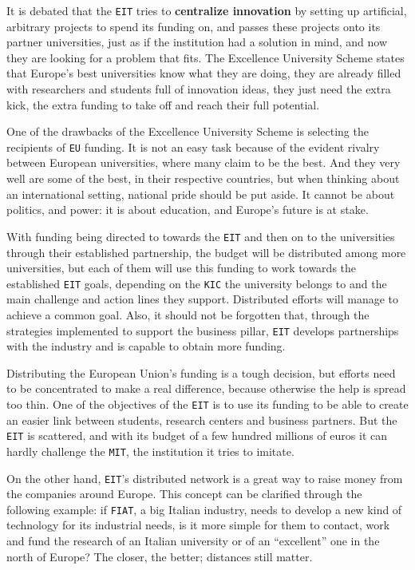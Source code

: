 \documentclass[11pt,a4paper,oneside,twocolumn]{IEEEtran}
\begin{document}
It is debated that the \texttt{EIT} tries to \textbf{centralize innovation} by setting up artificial, arbitrary projects to spend its funding on, and passes these projects onto its partner universities, just as if the institution had a solution in mind, and now they are looking for a problem that fits. The Excellence University Scheme states that Europe's best universities know what they are doing, they are already filled with researchers and students full of innovation ideas, they just need the extra kick, the extra funding to take off and reach their full potential.

One of the drawbacks of the Excellence University Scheme is selecting the recipients of \texttt{EU} funding. It is not an easy task because of the evident rivalry between European universities, where many claim to be the best. And they very well are some of the best, in their respective countries, but when thinking about an international setting, national pride should be put aside. It cannot be about politics, and power: it is about education, and Europe's future is at stake\cite{6_4}.

With funding being directed to towards the \texttt{EIT} and then on to the universities through their established partnership, the budget will be distributed among more universities, but each of them will use this funding to work towards the established \texttt{EIT} goals, depending on the \texttt{KIC} the university belongs to and the main challenge and action lines they support. Distributed efforts will manage to achieve a common goal. Also, it should not be forgotten that, through the strategies implemented to support the business pillar, \texttt{EIT} develops partnerships with the industry and is capable to obtain more funding.

Distributing the European Union's funding is a tough decision, but efforts need to be concentrated to make a real difference, because otherwise the help is spread too thin. One of the objectives of the \texttt{EIT} is to use its funding to be able to create an easier link between students, research centers and business partners. But the \texttt{EIT} is scattered, and with its budget of a few hundred millions of euros it can hardly challenge the \texttt{MIT}, the institution it tries to imitate.

On the other hand, \texttt{EIT}'s distributed network is a great way to raise money from the companies around Europe. This concept can be clarified through the following example: if \texttt{FIAT}, a big Italian industry, needs to develop a new kind of technology for its industrial needs, is it more simple for them to contact, work and fund the research of an Italian university or of an ``excellent'' one in the north of Europe? The closer, the better; distances still matter.
\end{document}
